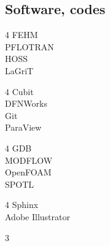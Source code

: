 \documentclass[11pt, letterpaper]{article}
\begin{document}
\subsection*{Software, codes}
\label{sec:software}
\noindent
\begin{multicols}{4}
    FEHM\\
    PFLOTRAN\\
    HOSS\\
    LaGriT
\end{multicols}
\begin{multicols}{4}
    Cubit\\
    DFNWorks\\
    Git\\
    ParaView
\end{multicols}
\begin{multicols}{4}
    GDB\\
    MODFLOW\\
    OpenFOAM\\
    SPOTL
\end{multicols}
\begin{multicols}{4}
    Sphinx\\
    Adobe Illustrator\\
\end{multicols}
\begin{multicols}{3}

\end{multicols}
\end{document}
